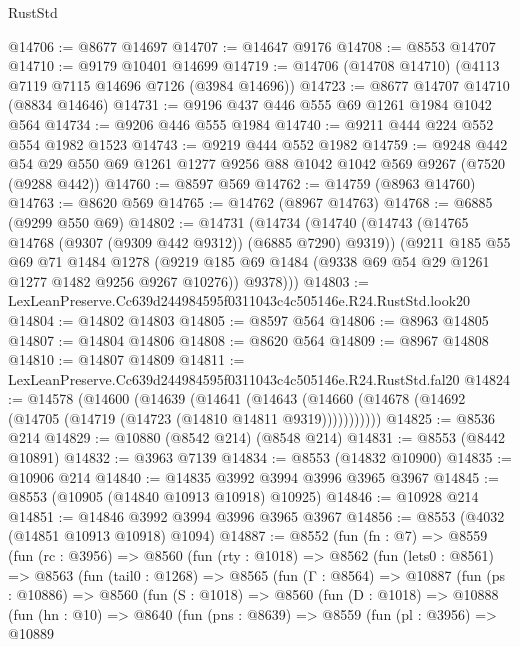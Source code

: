 \begin{lexlean}{RustStd}
\begin{coremodule}
@14706 := @8677 @14697
@14707 := @14647 @9176
@14708 := @8553 @14707
@14710 := @9179 @10401 @14699
@14719 := @14706 (@14708 @14710) (@4113 @7119 @7115 @14696 @7126 (@3984 @14696))
@14723 := @8677 @14707 @14710 (@8834 @14646)
@14731 := @9196 @437 @446 @555 @69 @1261 @1984 @1042 @564
@14734 := @9206 @446 @555 @1984
@14740 := @9211 @444 @224 @552 @554 @1982 @1523
@14743 := @9219 @444 @552 @1982
@14759 := @9248
    @442
    @54
    @29
    @550
    @69
    @1261
    @1277
    @9256
    @88
    @1042
    @1042
    @569
    @9267
    (@7520 (@9288 @442))
@14760 := @8597 @569
@14762 := @14759 (@8963 @14760)
@14763 := @8620 @569
@14765 := @14762 (@8967 @14763)
@14768 := @6885 (@9299 @550 @69)
@14802 := @14731
    (@14734
      (@14740
        (@14743 (@14765 @14768 (@9307 (@9309 @442 @9312)) (@6885 @7290) @9319))
        (@9211
          @185
          @55
          @69
          @71
          @1484
          @1278
          (@9219 @185 @69 @1484 (@9338 @69 @54 @29 @1261 @1277 @1482 @9256 @9267 @10276))
          @9378)))
@14803 := LexLeanPreserve.Cc639d244984595f0311043c4c505146e.R24.RustStd.look20
@14804 := @14802 @14803
@14805 := @8597 @564
@14806 := @8963 @14805
@14807 := @14804 @14806
@14808 := @8620 @564
@14809 := @8967 @14808
@14810 := @14807 @14809
@14811 := LexLeanPreserve.Cc639d244984595f0311043c4c505146e.R24.RustStd.fal20
@14824 := @14578
    (@14600
      (@14639
        (@14641
          (@14643 (@14660 (@14678 (@14692 (@14705 (@14719 (@14723 (@14810 @14811 @9319)))))))))))
@14825 := @8536 @214
@14829 := @10880 (@8542 @214) (@8548 @214)
@14831 := @8553 (@8442 @10891)
@14832 := @3963 @7139
@14834 := @8553 (@14832 @10900)
@14835 := @10906 @214
@14840 := @14835 @3992 @3994 @3996 @3965 @3967
@14845 := @8553 (@10905 (@14840 @10913 @10918) @10925)
@14846 := @10928 @214
@14851 := @14846 @3992 @3994 @3996 @3965 @3967
@14856 := @8553 (@4032 (@14851 @10913 @10918) @1094)
@14887 := @8552
    (fun (fn : @7) =>
    @8559
      (fun (rc : @3956) =>
      @8560
        (fun (rty : @1018) =>
        @8562
          (fun (lets0 : @8561) =>
          @8563
            (fun (tail0 : @1268) =>
            @8565
              (fun (Γ : @8564) =>
              @10887
                (fun (ps : @10886) =>
                @8560
                  (fun (S : @1018) =>
                  @8560
                    (fun (D : @1018) =>
                    @10888
                      (fun (hn : @10) =>
                      @8640
                        (fun (pns : @8639) =>
                        @8559
                          (fun (pl : @3956) =>
                          @10889

\end{coremodule}
\end{lexlean}
